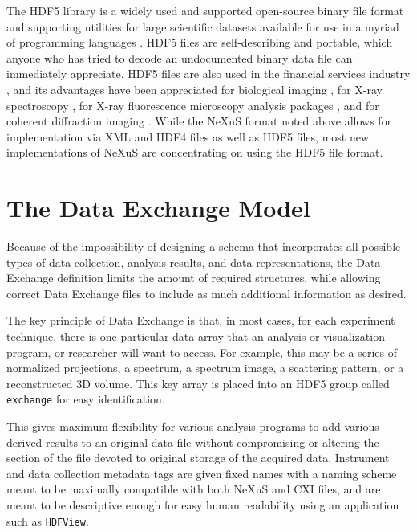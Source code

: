 \documentclass[pdf]{iucr}              %
\begin{document}
The HDF5 library is a widely used and supported open-source binary file format and supporting utilities for large scientific datasets available for use in a myriad of programming languages \cite{HDF5}. HDF5 files are self-describing and portable, which anyone who has tried to decode an undocumented binary data file can immediately appreciate. HDF5 files are also used in the financial services industry \cite{Bethel_2011}, and its advantages have been appreciated for biological imaging \cite{dougherty_cacm_2009,eliceiri_nm_2012}, for X-ray spectroscopy
\cite{ravel_jsr_2012,medjoubi_jsr_2013}, for X-ray fluorescence microscopy analysis packages \cite{vogt_jdp_2003,sole_sab_2007}, and for coherent diffraction imaging \cite{steinbrener_oe_2010,maia_nm_2012}. While the NeXuS format noted above allows for implementation via XML and HDF4 files as well as HDF5 files, most new implementations of NeXuS are concentrating on using the HDF5 file format.


\section{The Data Exchange Model}

Because of the impossibility of designing a schema that incorporates all possible types of data collection, analysis results, and data representations, the Data Exchange definition limits the amount of required structures, while allowing correct Data Exchange files to include as much additional information as desired.  

The key principle of Data Exchange is that, in most cases, for each experiment technique, there is one particular data array that an analysis or visualization program, or researcher will want to access. For example, this may be a series of normalized projections, a spectrum, a spectrum image, a scattering pattern, or a reconstructed 3D volume. This key array is placed into an HDF5 group called \texttt{exchange} for easy identification.

This gives maximum flexibility for various analysis programs to add various derived results to an original data file without compromising or altering the section of the file devoted to original storage of the acquired data. Instrument and data collection metadata tags are given fixed names with a naming scheme meant to be maximally compatible with both NeXuS \cite{NeXuS} and CXI \cite{maia_nm_2012} files, and are meant to be descriptive enough for easy human readability using an application such as \texttt{HDFView}. 
\end{document}
